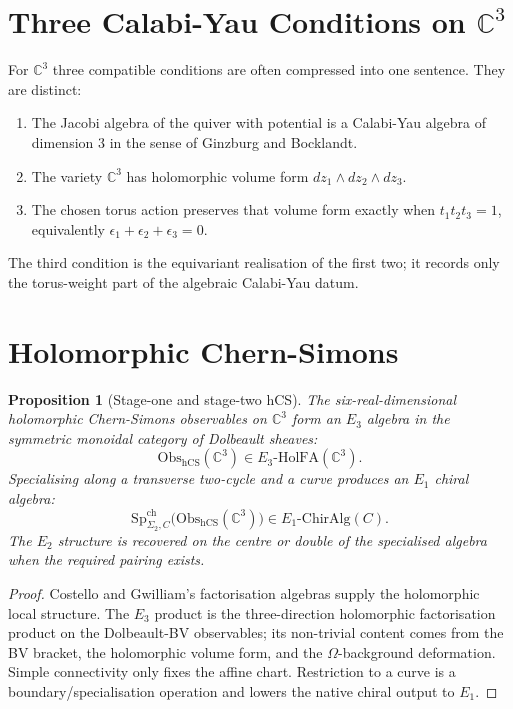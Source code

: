 \documentclass[11pt]{article}
\newtheorem{proposition}[theorem]{Proposition}
\theoremstyle{definition}
\theoremstyle{remark}
\providecommand{\hCS}{\mathrm{hCS}}
\providecommand{\HolFA}{\mathrm{HolFA}}
\providecommand{\Obs}{\mathrm{Obs}}
\providecommand{\CC}{\mathbb{C}}
\providecommand{\Eone}{E_1}
\providecommand{\Etwo}{E_2}
\providecommand{\Ethree}{E_3}
\providecommand{\SpCh}{\mathrm{Sp}^{\mathrm{ch}}}
\begin{document}
\section{Three Calabi-Yau Conditions on $\CC^3$}
\label{sec:cy3-conditions}

For $\CC^3$ three compatible conditions are often compressed into one
sentence. They are distinct:
\begin{enumerate}[label=\textup{(\roman*)}]
\item The Jacobi algebra of the quiver with potential is a
Calabi-Yau algebra of dimension $3$ in the sense of Ginzburg and
Bocklandt.
\item The variety $\CC^3$ has holomorphic volume form
$dz_1\wedge dz_2\wedge dz_3$.
\item The chosen torus action preserves that volume form exactly when
$t_1t_2t_3=1$, equivalently
$\epsilon_1+\epsilon_2+\epsilon_3=0$.
\end{enumerate}
The third condition is the equivariant realisation of the first two; it
records only the torus-weight part of the algebraic Calabi-Yau datum.

\section{Holomorphic Chern-Simons}
\label{sec:hcs}

\begin{proposition}[Stage-one and stage-two hCS]
\label{prop:hcs-two-stage}
The six-real-dimensional holomorphic Chern-Simons observables on
$\CC^3$ form an $\Ethree$ algebra in the symmetric monoidal category of
Dolbeault sheaves:
\[
 \Obs_{\hCS}(\CC^3)\in \Ethree\text{-}\HolFA(\CC^3).
\]
Specialising along a transverse two-cycle and a curve produces an
$\Eone$ chiral algebra:
\[
 \SpCh_{\Sigma_2,C}\bigl(\Obs_{\hCS}(\CC^3)\bigr)
 \in \Eone\text{-}\mathrm{ChirAlg}(C).
\]
The $\Etwo$ structure is recovered on the centre or double of the
specialised algebra when the required pairing exists.
\end{proposition}

\begin{proof}
Costello and Gwilliam's factorisation algebras supply the holomorphic
local structure. The $\Ethree$ product is the three-direction
holomorphic factorisation product on the Dolbeault-BV observables; its
non-trivial content comes from the BV bracket, the holomorphic volume
form, and the $\Omega$-background deformation.  Simple connectivity
only fixes the affine chart. Restriction to a curve is a
boundary/specialisation operation and lowers the native chiral output to
$\Eone$.
\end{proof}
\end{document}
